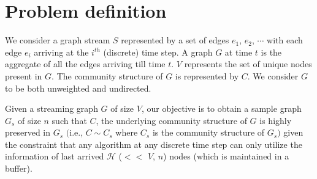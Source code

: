 \section{Problem definition}
\label{prob_def}

We consider a graph stream $S$ represented by a set of edges $e_1$, $e_2$, $\cdots$ with each edge $e_i$ arriving at the 
$i^{th}$ (discrete) time step. A graph $G$ at time $t$ is the aggregate of all the edges arriving till time $t$. 
$V$ represents the set of unique nodes present in  $G$. The community structure of $G$ is represented by $C$. We consider $G$ to be both unweighted and undirected. 


\begin{mydef}
Given a streaming graph $G$ of size $V$, our objective is to obtain a sample graph $G_s$ of size $n$ 
 such that $C$, the underlying community structure of $G$ is highly preserved in $G_s$  $($i.e., $C \sim C_s$ where $C_s$ is the community structure of $G_s)$ given the constraint that any
algorithm at any discrete time step can only utilize the information of 
last arrived $\mathcal{H}$ ($<<$ $V$, $n$) nodes (which is maintained in a buffer). 
\end{mydef}


